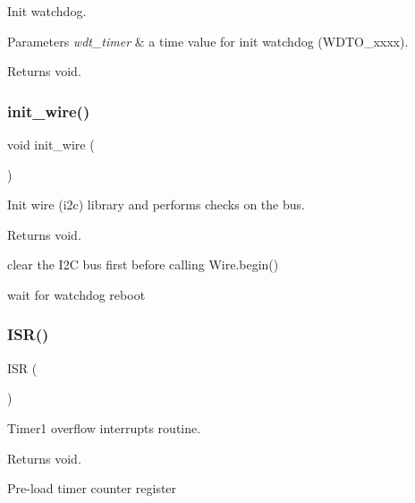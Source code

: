 Init watchdog. 


\begin{DoxyParams}{Parameters}
{\em wdt\+\_\+timer} & a time value for init watchdog (W\+D\+T\+O\+\_\+xxxx). \\
\hline
\end{DoxyParams}
\begin{DoxyReturn}{Returns}
void. 
\end{DoxyReturn}
\mbox{\label{i2c-th_8ino_a2441543100bf8421f56edd622a2c1d9a}} 
\subsubsection{\texorpdfstring{init\+\_\+wire()}{init\_wire()}}
{\footnotesize\ttfamily void init\+\_\+wire (\begin{DoxyParamCaption}\item[{void}]{ }\end{DoxyParamCaption})}



Init wire (i2c) library and performs checks on the bus. 

\begin{DoxyReturn}{Returns}
void. 
\end{DoxyReturn}
clear the I2C bus first before calling Wire.\+begin()

wait for watchdog reboot \mbox{\label{i2c-th_8ino_ab16889ae984b9b798989a0d239283cac}} 
\subsubsection{\texorpdfstring{I\+S\+R()}{ISR()}}
{\footnotesize\ttfamily I\+SR (\begin{DoxyParamCaption}\item[{T\+I\+M\+E\+R1\+\_\+\+O\+V\+F\+\_\+vect}]{ }\end{DoxyParamCaption})}



Timer1 overflow interrupts routine. 

\begin{DoxyReturn}{Returns}
void. 
\end{DoxyReturn}
Pre-\/load timer counter register

